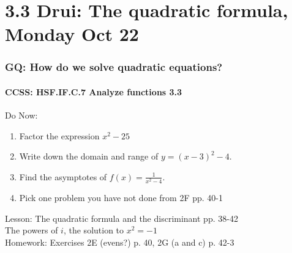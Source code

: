 \documentclass{beamer}
\begin{document}
\section{3.3 Drui: The quadratic formula, Monday Oct 22}
  \frame
  {
    \frametitle{GQ: How do we solve quadratic equations?}
    \framesubtitle{CCSS: HSF.IF.C.7 Analyze functions    \alert{3.3}}

    \begin{block}{Do Now: }
      \begin{enumerate}
          \item Factor the expression $x^2-25$
          \item Write down the domain and range of $y=(x-3)^2-4$.
          \item Find the asymptotes of $\displaystyle f(x)=\frac{1}{x^2-4}$.
          \item Pick one problem you have not done from 2F pp. 40-1
      \end{enumerate}
    \end{block}
    Lesson: The quadratic formula and the discriminant pp. 38-42 \\
    The powers of $i$, the solution to $x^2=-1$\\ \bigskip
    Homework: Exercises 2E (evens?) p. 40, 2G (a and c) p. 42-3
  }
\end{document}
